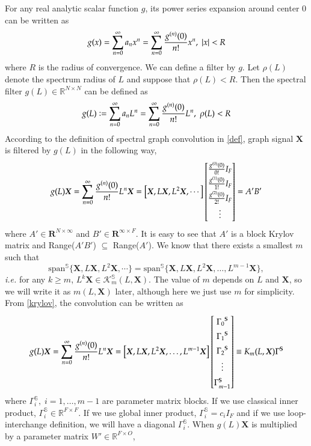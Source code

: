\documentclass{article}
\newcommand\ie{\textit{i.e.}}
\newcommand{\colvec}[2][1]{%
	\scalebox{#1}{%
		\renewcommand{\arraystretch}{1.45}%
		$\begin{bmatrix}#2\end{bmatrix}$%
	}
}
\begin{document}
For any real analytic scalar function $g$, its power series expansion around center 0 can be written as
$$g(x) = \sum\limits_{n=0}^\infty a_n x^n = \sum\limits_{n=0}^\infty \frac{g^{(n) } (0)}{n!} x^n, \; \abs{x} < R$$
where $R$ is the radius of convergence. We can define a filter by $g$.
Let $\rho(L)$ denote the spectrum radius of $L$ and suppose that $\rho(L) <R$. Then the spectral filter $g(L)\in \mathbb{R}^{N \times N}$ can be defined as
$$g(L) \vcentcolon = \sum\limits_{n=0}^\infty a_n L^n =\sum\limits_{n=0}^\infty \frac{g^{(n) } (0)}{n!} L^n, \; \rho(L) < R$$
According to the definition of spectral graph convolution in \eqref{def}, graph signal $\bm{X}$ is filtered by $g(L)$ in the following way,
$$ g(L) \bm{X} = \sum\limits_{n=0}^\infty \frac{g^{(n) } (0)}{n!} L^n \bm{X} =\left[\bm{X}, L\bm{X}, L^2\bm{X}, \cdots  \right] \colvec{\frac{g^{(0) } (0)}{0!} {I_{F}} \\ \frac{g^{(1) } (0)}{1!}{I_{F}}  \\ \frac{g^{(2) } (0)}{2!}{I_{F}}  \\ \vdots  } = A'B'$$
where $A' \in \mathbf{R}^{N \times \infty}$ and $B' \in \mathbf{R}^{\infty \times F}$. It is easy to see that  $A'$ is a block Krylov matrix and Range($A'B'$) $\subseteq$ Range($A'$).  We know that there exists a smallest $m$ such that \cite{frommer2017block}
\begin{equation} \label{krylov}
\text{span}^{\mathbb{S}} \{\bm{X}, L\bm{X}, L^2\bm{X}, \cdots  \} = \text{span}^{\mathbb{S}} \{\bm{X}, L\bm{X}, L^2\bm{X}, \dots,L^{m-1}\bm{X} \},
\end{equation}
\ie{} for any $k\geq m$, $L^k \bm{X} \in \mathcal{K}_m^{\mathbb{S}} (L,\bm{X})$. The value of $m$ depends on $L$ and $\bm{X}$, so we will write it as $m(L,\bm{X})$ later, although here we just use $m$ for simplicity. From \eqref{krylov}, the convolution can be written as
\begin{equation}\label{eq5}
g(L) \bm{X} = \sum\limits_{n=0}^\infty \frac{g^{(n) } (0)}{n!} L^n \bm{X} =\left[\bm{X}, L\bm{X}, L^2\bm{X}, \dots,L^{m-1}\bm{X}  \right] \colvec{ {\Gamma_0}^{\mathbb{S}}  \\ {\Gamma_1}^{\mathbb{S}}   \\ {\Gamma_2}^{\mathbb{S}} \\ \vdots \\ {\Gamma_{m-1}^{\mathbb{S}}} } \equiv  K_m (L,\bm{X}) \Gamma^{\mathbb{S}}
\end{equation}
where ${\Gamma_{i}^{\mathbb{S}}},\; i=1,\dots, m-1$ are parameter matrix blocks. If we use classical inner product, ${\Gamma_{i}^{\mathbb{S}}} \in \mathbb{R}^{F\times F}$. If we use global inner product, $\Gamma_i^{\mathbb{S}} = c_i {I_F}$ and if we use loop-interchange definition, we will have a diagonal $\Gamma_i^{\mathbb{S}}$. When $g(L)\bm{X}$ is multiplied by a parameter matrix $W' \in \mathbb{R}^{F \times O}$,
\end{document}
